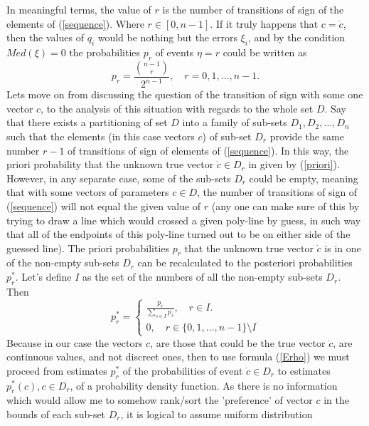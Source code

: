 \documentclass[a4paper]{article}
\numberwithin{equation}{subsection}
\begin{document}
In meaningful terms, the value of $r$ is the number of transitions of sign of the elements of  (\ref{sequence}). Where $r \in [0,n-1]$. If it truly happens that $c=\dot{c}$, then the values of $q_{i}$ would be nothing but the errors $\xi_{i}$, and by the condition $Med(\xi)=0$ the probabilities $p_{r}$ of events $\eta = r$ could be written as
\begin{equation}
p_{r}= \frac{\binom {n-1}r}{2^{n-1}}, \quad r = 0,1,\dots,n-1. \label{priori}
\end{equation}
Lets move on from discussing the question of the transition of sign with some one vector $c$, to the analysis of this situation with regards to the whole set $D$. Say that there exists a partitioning of set $D$ into a family of sub-sets $D_{1},D_{2},\dots,D_{n}$ such that the elements (in this case vectors $c$) of sub-set $D_{r}$ provide the same number $r-1$ of transitions of sign of elements of (\ref{sequence}). In this way, the priori probability that the unknown true vector $\dot{c} \in D_{r}$ in given by (\ref{priori}). However, in any separate case, some of the sub-sets $D_{r}$ could be empty, meaning  that with some vectors of parameters $c \in D$, the number of transitions of sign of (\ref{sequence}) will not equal the given value of $r$ (any one can make sure of this by trying to draw a line which would crossed a given poly-line by guess, in such way that all of the endpoints of this poly-line turned out to be on either side of the guessed line). The priori probabilities $p_{r}$ that the unknown true vector $\dot{c}$ is in one of the non-empty sub-sets $D_{r}$ can be recalculated to the posteriori probabilities $p_{r}^{*}$. Let's define $I$ as the set of the numbers of all the non-empty sub-sets $D_{r}$. Then
\begin{equation}
p_{r}^{*}= 
\begin{cases} 
		\frac{p_{r}}{\sum\limits_{s \in I}p_{s}}, \quad r \in I.\\
		0, \quad r \in \{ 0,1,\dots,n-1 \} \setminus I
\end{cases}
\end{equation}
Because in our case the vectors $c$, are those that could be the true vector $\dot{c}$, are continuous values, and not discreet ones, then to use formula (\ref{Erho}) we must proceed from estimates $p_{r}^{*}$ of the probabilities of event $\dot{c} \in D_{r}$ to estimates $p_{r}^{*}(c), c \in D_{r}$, of a probability density function. As there is no information  which would allow me to somehow rank/sort the 'preference' of vector $c$ in the bounds of each sub-set $D_{r}$, it is logical to assume uniform distribution
\end{document}
